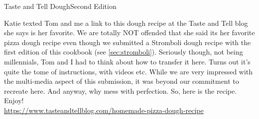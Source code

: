 \begin{entry}{Taste and Tell Dough}{Second Edition}

\begin{open}
 Katie texted Tom and me a link to this dough recipe at the Taste and Tell blog
 she says is her favorite. We are totally NOT offended that she said its her
 favorite pizza dough recipe even though we submitted a Stromboli dough recipe
 with the first edition of this cookbook (see \ref{sec:stromboli}). Seriously
 though, not being millennials, Tom and I had to think about how to transfer it
 here. Turns out it's quite the tome of instructions, with videos etc. While we
 are very impressed with the multi-media aspect of this submission, it was
 beyond our commitment to recreate here. And anyway, why mess with perfection.
 So, here is the recipe. Enjoy!\\

\noindent\url{https://www.tasteandtellblog.com/homemade-pizza-dough-recipe}
\end{open}

\end{entry}


